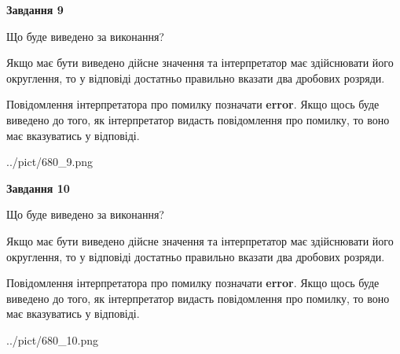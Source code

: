 \documentclass[12pt, ukrainian]{article}
\begin{document}
{\begin {Large}
{\begin {center}\textbf{Завдання 9}\end {center}}\par
Що буде виведено за виконання? \par

Якщо має бути виведено дійсне значення та інтерпретатор має здійснювати його округлення, 
то у відповіді достатньо правильно вказати два дробових розряди.

Повідомлення інтерпретатора про помилку позначати \textbf{error}.
Якщо щось буде виведено до того, як інтерпретатор видасть повідомлення про помилку, 
то воно має вказуватись у відповіді. \par

\begin{center}
	{../pict/680_9.png}
\end{center}
\newpage

{\begin {center}\textbf{Завдання 10}\end {center}}\par
Що буде виведено за виконання? \par

Якщо має бути виведено дійсне значення та інтерпретатор має здійснювати його округлення, 
то у відповіді достатньо правильно вказати два дробових розряди.

Повідомлення інтерпретатора про помилку позначати \textbf{error}.
Якщо щось буде виведено до того, як інтерпретатор видасть повідомлення про помилку, 
то воно має вказуватись у відповіді. \par

\begin{center}
	{../pict/680_10.png}
\end{center}
\newpage

\end {Large}}
\end{document}
